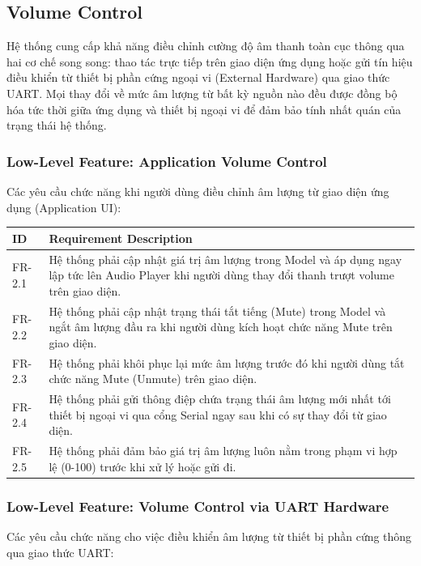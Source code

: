 \documentclass{article}
\begin{document}
\subsection{Volume Control}
Hệ thống cung cấp khả năng điều chỉnh cường độ âm thanh toàn cục thông qua hai cơ chế song song: thao tác trực tiếp trên giao diện ứng dụng hoặc gửi tín hiệu điều khiển từ thiết bị phần cứng ngoại vi (External Hardware) qua giao thức UART. Mọi thay đổi về mức âm lượng từ bất kỳ nguồn nào đều được đồng bộ hóa tức thời giữa ứng dụng và thiết bị ngoại vi để đảm bảo tính nhất quán của trạng thái hệ thống.

\subsubsection{Low-Level Feature: Application Volume Control}
Các yêu cầu chức năng khi người dùng điều chỉnh âm lượng từ giao diện ứng dụng (Application UI):

\begin{center}
\renewcommand{\arraystretch}{1.5}
\begin{tabular}{|l|p{12cm}|}
\hline
\textbf{ID} & \textbf{Requirement Description} \\ \hline
FR-2.1 & Hệ thống phải cập nhật giá trị âm lượng trong Model và áp dụng ngay lập tức lên Audio Player khi người dùng thay đổi thanh trượt volume trên giao diện. \\ \hline
FR-2.2 & Hệ thống phải cập nhật trạng thái tắt tiếng (Mute) trong Model và ngắt âm lượng đầu ra khi người dùng kích hoạt chức năng Mute trên giao diện. \\ \hline
FR-2.3 & Hệ thống phải khôi phục lại mức âm lượng trước đó khi người dùng tắt chức năng Mute (Unmute) trên giao diện. \\ \hline
FR-2.4 & Hệ thống phải gửi thông điệp chứa trạng thái âm lượng mới nhất tới thiết bị ngoại vi qua cổng Serial ngay sau khi có sự thay đổi từ giao diện. \\ \hline
FR-2.5 & Hệ thống phải đảm bảo giá trị âm lượng luôn nằm trong phạm vi hợp lệ (0-100) trước khi xử lý hoặc gửi đi. \\ \hline
\end{tabular}
\end{center}

\subsubsection{Low-Level Feature: Volume Control via UART Hardware}
Các yêu cầu chức năng cho việc điều khiển âm lượng từ thiết bị phần cứng thông qua giao thức UART:
\end{document}
